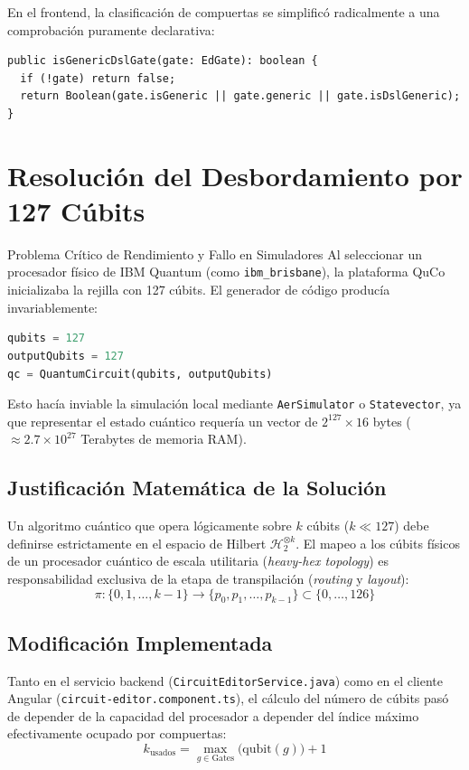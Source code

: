 \documentclass[11pt,a4paper]{article}
\begin{document}
En el frontend, la clasificación de compuertas se simplificó radicalmente a una comprobación puramente declarativa:
\begin{lstlisting}[language=HTML, caption={Deteccion reactiva en TypeScript}]
public isGenericDslGate(gate: EdGate): boolean {
  if (!gate) return false;
  return Boolean(gate.isGeneric || gate.generic || gate.isDslGeneric);
}
\end{lstlisting}

\section{Resolución del Desbordamiento por 127 Cúbits}

\begin{warningbox}{Problema Crítico de Rendimiento y Fallo en Simuladores}
Al seleccionar un procesador físico de IBM Quantum (como \texttt{ibm\_brisbane}), la plataforma QuCo inicializaba la rejilla con 127 cúbits. El generador de código producía invariablemente:
\begin{lstlisting}[language=Python]
qubits = 127
outputQubits = 127
qc = QuantumCircuit(qubits, outputQubits)
\end{lstlisting}
Esto hacía inviable la simulación local mediante \texttt{AerSimulator} o \texttt{Statevector}, ya que representar el estado cuántico requería un vector de $2^{127} \times 16$ bytes ($\approx 2.7 \times 10^{27}$ Terabytes de memoria RAM).
\end{warningbox}

\subsection{Justificación Matemática de la Solución}
Un algoritmo cuántico que opera lógicamente sobre $k$ cúbits ($k \ll 127$) debe definirse estrictamente en el espacio de Hilbert $\mathcal{H}_2^{\otimes k}$. El mapeo a los cúbits físicos de un procesador cuántico de escala utilitaria (\textit{heavy-hex topology}) es responsabilidad exclusiva de la etapa de transpilación (\textit{routing} y \textit{layout}):
\begin{equation}
    \pi: \{0, 1, \dots, k-1\} \longrightarrow \{p_0, p_1, \dots, p_{k-1}\} \subset \{0, \dots, 126\}
\end{equation}

\subsection{Modificación Implementada}
Tanto en el servicio backend (\texttt{CircuitEditorService.java}) como en el cliente Angular (\texttt{circuit-editor.component.ts}), el cálculo del número de cúbits pasó de depender de la capacidad del procesador a depender del índice máximo efectivamente ocupado por compuertas:
\begin{equation}
    k_{\text{usados}} = \max_{g \in \text{Gates}} \big(\text{qubit}(g)\big) + 1
\end{equation}
\end{document}

